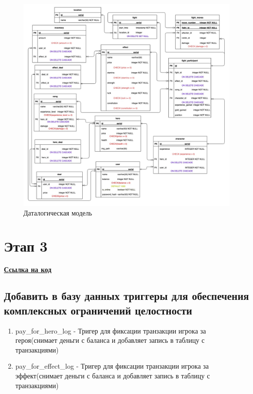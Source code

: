 \begin{figure}[H]
	\begin{center}
		\includegraphics[scale=0.44]{images/Datalogical.jpg}
		\caption{Даталогическая модель}
		\label{pic:pic_name} %
	\end{center}
\end{figure}

\newpage

\section*{Этап 3}


\faGithub\href{https://github.com/Vakzu/musical-wars-backend/tree/main/src/main/resources/sql_scripts}{\textbf{Ссылка на код}}

\subsection*{Добавить в базу данных триггеры для обеспечения комплексных ограничений
целостности}


\begin{enumerate}
    \item pay\_for\_hero\_log 
    - Тригер для фиксации транзакции игрока за героя(снимает деньги с баланса и добавляет запись в таблицу с транзакциями)

    \item pay\_for\_effect\_log
    - Тригер для фиксации транзакции игрока за эффект(снимает деньги с баланса и добавляет запись в таблицу с транзакциями)
\end{enumerate}

